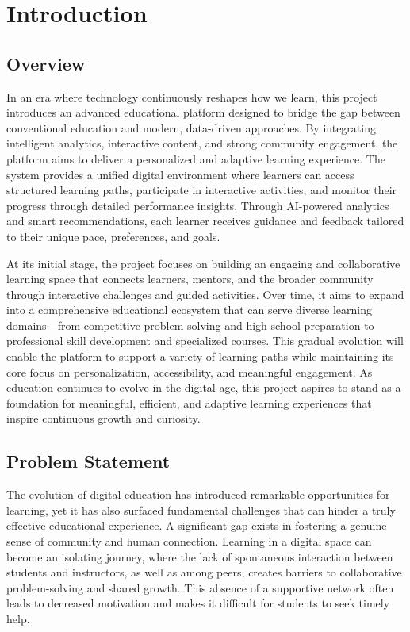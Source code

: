 \chapter{Introduction}
\label{chap:introduction}

\section{Overview}
\label{sec:overview}
In an era where technology continuously reshapes how we learn, this project introduces an advanced educational platform designed to bridge the gap between conventional education and modern, data-driven approaches. By integrating intelligent analytics, interactive content, and strong community engagement, the platform aims to deliver a personalized and adaptive learning experience. The system provides a unified digital environment where learners can access structured learning paths, participate in interactive activities, and monitor their progress through detailed performance insights. Through AI-powered analytics and smart recommendations, each learner receives guidance and feedback tailored to their unique pace, preferences, and goals.

At its initial stage, the project focuses on building an engaging and collaborative learning space that connects learners, mentors, and the broader community through interactive challenges and guided activities. Over time, it aims to expand into a comprehensive educational ecosystem that can serve diverse learning domains—from competitive problem-solving and high school preparation to professional skill development and specialized courses. This gradual evolution will enable the platform to support a variety of learning paths while maintaining its core focus on personalization, accessibility, and meaningful engagement. As education continues to evolve in the digital age, this project aspires to stand as a foundation for meaningful, efficient, and adaptive learning experiences that inspire continuous growth and curiosity.

\section{Problem Statement}
\label{sec:problem_statement}
The evolution of digital education has introduced remarkable opportunities for learning, yet it has also surfaced fundamental challenges that can hinder a truly effective educational experience. A significant gap exists in fostering a genuine sense of community and human connection. Learning in a digital space can become an isolating journey, where the lack of spontaneous interaction between students and instructors, as well as among peers, creates barriers to collaborative problem-solving and shared growth. This absence of a supportive network often leads to decreased motivation and makes it difficult for students to seek timely help.

